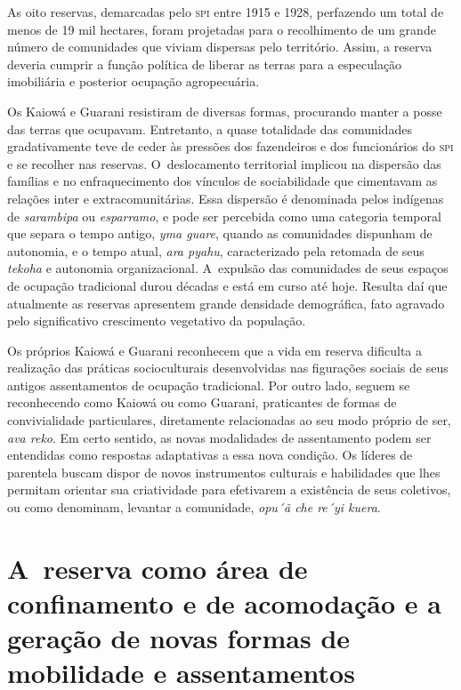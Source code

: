 As oito reservas, demarcadas pelo \textsc{spi} entre 1915 e 1928, perfazendo um
total de menos de 19 mil hectares, foram projetadas para o recolhimento
de um grande número de comunidades que viviam dispersas pelo
território. Assim, a reserva deveria cumprir a função política de
liberar as terras para a especulação imobiliária e posterior ocupação
agropecuária. 

Os Kaiowá e Guarani resistiram de diversas formas, procurando manter a
posse das terras que ocupavam. Entretanto, a quase totalidade das
comunidades gradativamente teve de ceder às pressões dos fazendeiros e
dos funcionários do \textsc{spi} e se recolher nas reservas. O~deslocamento
territorial implicou na dispersão das famílias e no enfraquecimento dos
vínculos de sociabilidade que cimentavam as relações inter e
extracomunitárias. Essa dispersão é denominada pelos indígenas de
\emph{sarambipa} ou \emph{esparramo}, e pode ser percebida como uma categoria
temporal que separa o tempo antigo, \emph{yma guare}, quando as comunidades
dispunham de autonomia, e o tempo atual, \emph{ara pyahu}, caracterizado pela
retomada de seus \emph{tekoha} e autonomia organizacional. A~expulsão das
comunidades de seus espaços de ocupação tradicional durou décadas e
está em curso até hoje. Resulta daí que atualmente as reservas
apresentem grande densidade demográfica, fato agravado pelo
significativo crescimento vegetativo da população.

Os próprios Kaiowá e Guarani reconhecem que a vida em reserva dificulta
a realização das práticas socioculturais desenvolvidas nas figurações
sociais de seus antigos assentamentos de ocupação tradicional. Por
outro lado, seguem se reconhecendo como Kaiowá ou como Guarani,
praticantes de formas de convivialidade particulares, diretamente
relacionadas ao seu modo próprio de ser, \emph{ava reko}. Em certo sentido, as
novas modalidades de assentamento podem ser entendidas como respostas
adaptativas a essa nova condição. Os líderes de parentela buscam dispor
de novos instrumentos culturais e habilidades que lhes permitam
orientar sua criatividade para efetivarem a existência de seus
coletivos, ou como denominam, levantar a comunidade, \emph{opu´ã che re´yi
kuera}.

\section{A~reserva como área de confinamento e de acomodação e a geração de novas
formas de mobilidade e assentamentos}

